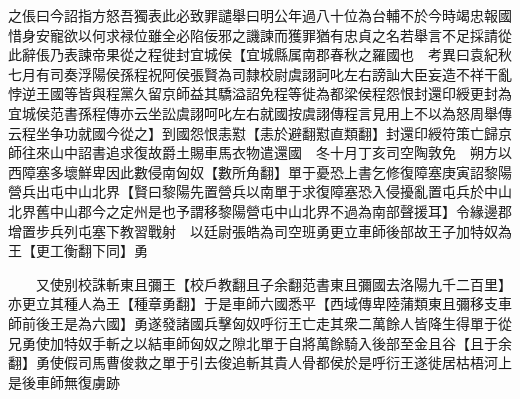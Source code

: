 之倀曰今詔指方怒吾獨表此必致罪譴舉曰明公年過八十位為台輔不於今時竭忠報國惜身安寵欲以何求禄位雖全必陷佞邪之譏諫而獲罪猶有忠貞之名若舉言不足採請從此辭倀乃表諫帝果從之程徙封宜城侯【宜城縣属南郡春秋之羅國也　考異曰袁紀秋七月有司奏浮陽侯孫程祝阿侯張賢為司隸校尉虞詡訶叱左右謗訕大臣妄造不祥干亂悖逆王國等皆與程黨久留京師益其驕溢詔免程等徙為都梁侯程怨恨封還印綬更封為宜城侯范書孫程傳亦云坐訟虞詡呵叱左右就國按虞詡傳程言見用上不以為怒周舉傳云程坐争功就國今從之】到國怨恨恚懟【恚於避翻懟直類翻】封還印綬符策亡歸京師往來山中詔書追求復故爵土賜車馬衣物遣還國　冬十月丁亥司空陶敦免　朔方以西障塞多壞鮮卑因此數侵南匈奴【數所角翻】單于憂恐上書乞修復障塞庚寅詔黎陽營兵出屯中山北界【賢曰黎陽先置營兵以南單于求復障塞恐入侵擾亂置屯兵於中山北界舊中山郡今之定州是也予謂移黎陽營屯中山北界不過為南部聲援耳】令緣邊郡增置步兵列屯塞下教習戰射　以廷尉張皓為司空班勇更立車師後部故王子加特奴為王【更工衡翻下同】勇

　　又使别校誅斬東且彌王【校戶教翻且子余翻范書東且彌國去洛陽九千二百里】亦更立其種人為王【種章勇翻】于是車師六國悉平【西域傳卑陸蒲類東且彌移支車師前後王是為六國】勇遂發諸國兵擊匈奴呼衍王亡走其衆二萬餘人皆降生得單于從兄勇使加特奴手斬之以結車師匈奴之隙北單于自將萬餘騎入後部至金且谷【且于余翻】勇使假司馬曹俊救之單于引去俊追斬其貴人骨都侯於是呼衍王遂徙居枯梧河上是後車師無復虜跡

